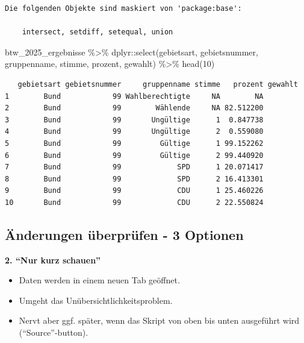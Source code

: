 \documentclass[
  custompaper,
  DIV=11,
  numbers=noendperiod]{scrartcl}
\newenvironment{Shaded}{\begin{snugshade}}{\end{snugshade}}
\newcommand{\DecValTok}[1]{\textcolor[rgb]{0.68,0.00,0.00}{#1}}
\newcommand{\FunctionTok}[1]{\textcolor[rgb]{0.28,0.35,0.67}{#1}}
\newcommand{\NormalTok}[1]{\textcolor[rgb]{0.00,0.23,0.31}{#1}}
\newcommand{\SpecialCharTok}[1]{\textcolor[rgb]{0.37,0.37,0.37}{#1}}
\begin{document}
\begin{verbatim}
Die folgenden Objekte sind maskiert von 'package:base':

    intersect, setdiff, setequal, union
\end{verbatim}

\begin{Shaded}
\begin{Highlighting}[]
\NormalTok{btw\_2025\_ergebnisse }\SpecialCharTok{\%\textgreater{}\%}
\NormalTok{  dplyr}\SpecialCharTok{::}\FunctionTok{select}\NormalTok{(gebietsart, gebietsnummer, gruppenname, stimme, prozent, gewahlt) }\SpecialCharTok{\%\textgreater{}\%}
  \FunctionTok{head}\NormalTok{(}\DecValTok{10}\NormalTok{)}
\end{Highlighting}
\end{Shaded}

\begin{verbatim}
   gebietsart gebietsnummer     gruppenname stimme   prozent gewahlt
1        Bund            99 Wahlberechtigte     NA        NA        
2        Bund            99        Wählende     NA 82.512200        
3        Bund            99       Ungültige      1  0.847738        
4        Bund            99       Ungültige      2  0.559080        
5        Bund            99         Gültige      1 99.152262        
6        Bund            99         Gültige      2 99.440920        
7        Bund            99             SPD      1 20.071417        
8        Bund            99             SPD      2 16.413301        
9        Bund            99             CDU      1 25.460226        
10       Bund            99             CDU      2 22.550824        
\end{verbatim}

\subsection{Änderungen überprüfen - 3
Optionen}\label{uxe4nderungen-uxfcberpruxfcfen---3-optionen-1}

\textbf{2. ``Nur kurz schauen''}

\begin{itemize}
\item
  Daten werden in einem neuen Tab geöffnet.
\item
  Umgeht das Unübersichtlichkeitsproblem.
\item
  Nervt aber ggf. später, wenn das Skript von oben bis unten ausgeführt
  wird (``Source''-button).
\end{itemize}
\end{document}
